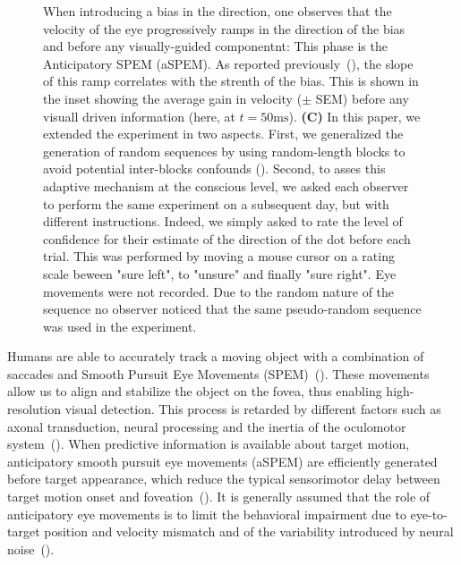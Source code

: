 \documentclass[profile,final,english, draft]{article}%
\newcommand{\ms}{\si{\milli\second}}%
\newcommand{\citep}[1]{(\cite{#1})}
\begin{document}
\begin{figure}
{When introducing a bias in the direction,
one observes that the velocity of the eye progressively ramps
in the direction of the bias and before any visually-guided componentnt:
This phase is the Anticipatory SPEM (aSPEM).
As reported previously~\citep{Montagnini2010, SantosKowler2017},
the slope of this ramp correlates with the strenth of the bias.
This is shown in the inset showing the average gain in velocity ($\pm$ SEM)
before any visuall driven information (here, at $t=50 \ms$).
\textbf{(C)} In this paper, we extended the experiment in two aspects.
First, we generalized the generation of random sequences
by using random-length blocks
to avoid potential inter-blocks confounds ().
Second, to asses this adaptive mechanism at the conscious level,
we asked each observer to perform the same experiment on a subsequent day,
but with different instructions.
Indeed, we simply asked to rate the level of confidence
for their estimate of the direction of the dot before each trial.
This was performed by moving a mouse cursor on a rating scale
beween "sure left", to "unsure" and finally "sure right".
Eye movements were not recorded.
Due to the random nature of the sequence no observer noticed
that the same pseudo-random sequence was used in the experiment.
 }
\label{fig:intro}
\end{figure}
Humans are able to accurately track a moving object
with a combination of saccades and
Smooth Pursuit Eye Movements (SPEM)~\citep{ref}.
These movements allow us to align and
stabilize the object on the fovea,
thus enabling high-resolution visual detection.
This process is retarded by different factors such as axonal transduction,
neural processing and the inertia of the oculomotor system~\citep{Krauzlis}.
When predictive information is available about target motion,
anticipatory smooth pursuit eye movements (aSPEM) are
efficiently generated before target appearance,
which reduce the typical sensorimotor delay
between target motion onset and foveation~\citep{PerrinetAdamasFriston2014}.
It is generally assumed that the role of anticipatory eye movements is
to limit the behavioral impairment due
to eye-to-target position and velocity mismatch and
of the variability introduced by neural noise~\citep{WolpertXXX}.
\end{document}
